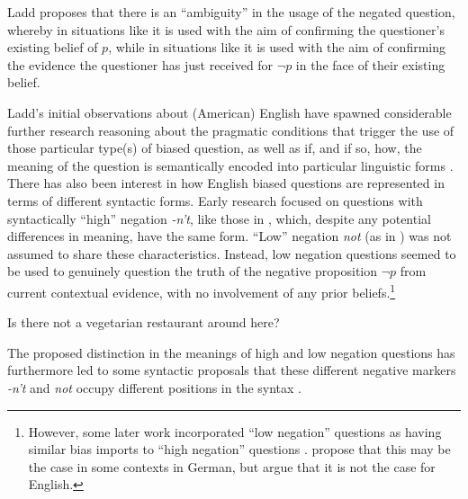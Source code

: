 \documentclass[output=paper,colorlinks,citecolor=brown]{langscibook}
\begin{document}
Ladd proposes that there is an ``ambiguity'' in the usage of the negated question, whereby in situations like  it is used with the aim of confirming the questioner's existing belief of $p$, while in situations like   it is used with the aim of confirming the evidence the questioner has just received for $\neg p$ in the face of their existing belief.

Ladd's initial observations about (American) English have spawned considerable further research reasoning about the pragmatic conditions that trigger the use of those particular type(s) of biased question, as well as if, and if so, how, the meaning of the question is semantically encoded into particular linguistic forms \citep{buring_arent1_2000, van_rooij_polar_2003, romero_negative_2004, asher_intonation_2007, anderbois_issues_2011, northrup_grounds_2014}. There has also been interest in how English biased questions are represented in terms of different syntactic forms. Early research focused on questions with syntactically ``high'' negation \textit{-n't}, like those in , which, despite any potential differences in meaning, have the same form. ``Low'' negation \textit{not} (as in ) was not assumed to share these characteristics. Instead, low negation questions seemed to be used to genuinely question the truth of the negative proposition $\neg p$ from current contextual evidence, with no involvement of any prior beliefs.\footnote{However, some later work incorporated ``low negation'' questions as having similar bias imports to ``high negation'' questions \citep{van_rooij_polar_2003, asher_intonation_2007}. \citet{domaneschi_bias_2017} propose that this may be the case in some contexts in German, but argue that it is not the case for English.}

\begin{exe}
\ex \label{lowneg} Is there not a vegetarian restaurant around here?
\end{exe}

The proposed distinction in the meanings of high and low negation questions has furthermore led to some syntactic proposals that these different negative markers \textit{-n't} and \textit{not} occupy different positions in the syntax \citep{cormack_english1_2012, krifka_bias_2015}.
\end{document}
